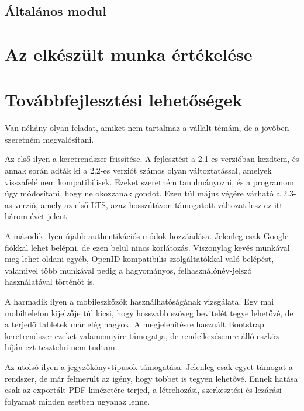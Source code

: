 \documentclass[a4paper,12pt,oneside]{report}
\begin{document}
\subsection{Általános modul}


\section{Az elkészült munka értékelése}


\section{Továbbfejlesztési lehetőségek}

Van néhány olyan feladat, amiket nem tartalmaz a vállalt témám, de a jövőben szeretném megvalósítani.

Az első ilyen a keretrendszer frissítése. A fejlesztést a 2.1-es verzióban kezdtem, és annak során adták ki a 2.2-es verziót számos olyan változtatással, amelyek visszafelé nem kompatibilisek. Ezeket szeretném tanulmányozni, és a programom úgy módosítani, hogy ne okozzanak gondot. Ezen túl május végére várható a 2.3-as verzió, amely az első LTS, azaz hosszútávon támogatott változat lesz \textendash{} ez itt három évet jelent.

A második ilyen újabb authentikációs módok hozzáadása. Jelenleg csak Google fiókkal lehet belépni, de ezen belül nincs korlátozás. Viszonylag kevés munkával meg lehet oldani egyéb, OpenID-kompatibilis szolgáltatókkal való belépést, valamivel több munkával pedig a hagyományos, felhasználónév-jelszó használatával történőt is.

A harmadik ilyen a mobileszközök használhatóságának vizsgálata. Egy mai mobiltelefon kijelzője túl kicsi, hogy hosszabb szöveg bevitelét tegye lehetővé, de a terjedő tabletek már elég nagyok. A megjelenítésre használt Bootstrap keretrendszer ezeket valamennyire támogatja, de rendelkezésemre álló eszköz híján ezt tesztelni nem tudtam.

Az utolsó ilyen a jegyzőkönyvtípusok támogatása. Jelenleg csak egyet támogat a rendszer, de már felmerült az igény, hogy többet is tegyen lehetővé. Ennek hatása csak az exportált PDF kinézetére terjed, a létrehozási, szerkesztési és lezárási folyamat minden esetben ugyanaz lenne.

\renewcommand{\bibname}{Irodalomjegyzék}


\end{document}
